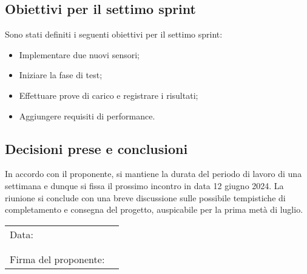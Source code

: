 \documentclass[italian,12pt]{article}
\begin{document}
\subsection{Obiettivi per il settimo sprint}
Sono stati definiti i seguenti obiettivi per il settimo sprint:
\begin{itemize}
	\item Implementare due nuovi sensori;
	\item Iniziare la fase di test;
	\item Effettuare prove di carico e registrare i risultati;
	\item Aggiungere requisiti di performance.
\end{itemize}

\subsection{Decisioni prese e conclusioni}
In accordo con il proponente, si mantiene la durata del periodo di lavoro di una settimana e dunque si fissa il prossimo incontro in data
12 giugno 2024. La riunione si conclude con una breve discussione sulle possibile tempistiche di completamento e consegna del progetto,
auspicabile per la prima metà di luglio.

\begin{table}[b]
	\begin{tabular}{@{}p{5cm}p{10cm}@{}}
		Data:                 & \hrulefill \\
		                      &            \\
		                      &            \\
		Firma del proponente: & \hrulefill \\
	\end{tabular}
\end{table}
\end{document}
